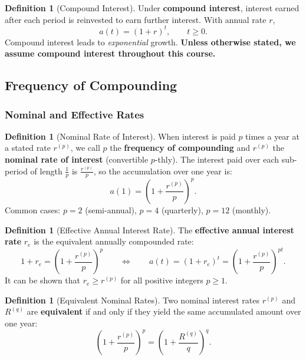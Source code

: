 \documentclass[12pt, a4paper]{article}
\theoremstyle{plain}
\theoremstyle{definition}
\newtheorem{definition}[theorem]{Definition}
\theoremstyle{remark}
\begin{document}
\begin{definition}[Compound Interest]
  Under \textbf{compound interest}, interest earned after each period is reinvested to earn further interest. With annual rate $r$,
  \[
    a(t) = (1+r)^t, \qquad t \geq 0.
  \]
  Compound interest leads to \emph{exponential} growth. \textbf{Unless otherwise stated, we assume compound interest throughout this course.}
\end{definition}

\subsection{Frequency of Compounding}

\subsubsection{Nominal and Effective Rates}

\begin{definition}[Nominal Rate of Interest]
  When interest is paid $p$ times a year at a stated rate $r^{(p)}$, we call $p$ the \textbf{frequency of compounding} and $r^{(p)}$ the \textbf{nominal rate of interest} (convertible $p$-thly). The interest paid over each sub-period of length $\tfrac{1}{p}$ is $\tfrac{r^{(p)}}{p}$, so the accumulation over one year is:
  \[
    a(1) = \left(1 + \frac{r^{(p)}}{p}\right)^p.
  \]
  Common cases: $p = 2$ (semi-annual), $p = 4$ (quarterly), $p = 12$ (monthly).
\end{definition}

\begin{definition}[Effective Annual Interest Rate]
  The \textbf{effective annual interest rate} $r_e$ is the equivalent annually compounded rate:
  \[
    1 + r_e = \left(1 + \frac{r^{(p)}}{p}\right)^p \qquad \Longleftrightarrow \qquad a(t) = (1+r_e)^t = \left(1 + \frac{r^{(p)}}{p}\right)^{pt}.
  \]
  It can be shown that $r_e \geq r^{(p)}$ for all positive integers $p \geq 1$.
\end{definition}

\begin{definition}[Equivalent Nominal Rates]
  Two nominal interest rates $r^{(p)}$ and $R^{(q)}$ are \textbf{equivalent} if and only if they yield the same accumulated amount over one year:
  \[
    \left(1 + \frac{r^{(p)}}{p}\right)^p = \left(1 + \frac{R^{(q)}}{q}\right)^q.
  \]
\end{definition}
\end{document}
